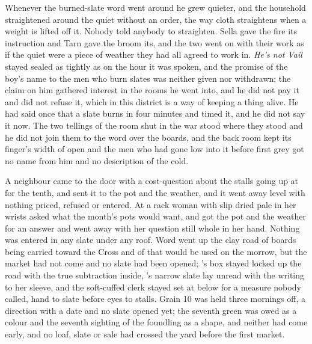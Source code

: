 Whenever the burned-slate word went around he grew quieter, and the household straightened around the quiet without an order, the way cloth straightens when a weight is lifted off it. Nobody told anybody to straighten. Sella gave the fire its instruction and Tarn gave the broom its, and the two went on with their work as if the quiet were a piece of weather they had all agreed to work in. \emph{He's not Vail} stayed sealed as tightly as on the hour it was spoken, and the promise of the boy's name to the men who burn slates was neither given nor withdrawn; the claim on him gathered interest in the rooms he went into, and he did not pay it and did not refuse it, which in this district is a way of keeping a thing alive. He had said once that a slate burns in four minutes and timed it, and he did not say it now. The two tellings of the room shut in the war stood where they stood and he did not join them to the word over the boards, and the back room kept its finger's width of open and the men who had gone low into it before first grey got no name from him and no description of the cold.

A neighbour came to the door with a cost-question about the stalls going up at  for the tenth, and  sent it to the pot and the weather, and it went away level with nothing priced, refused or entered. At  a rack woman with slip dried pale in her wrists asked what the month's pots would want, and got the pot and the weather for an answer and went away with her question still whole in her hand. Nothing was entered in any slate under any roof. Word went up the clay road of boards being carried toward the Cross and of  that would be used on the morrow, but the market had not come and no slate had been opened; 's box stayed locked up the road with the true subtraction inside, 's narrow slate lay unread with the writing to her sleeve, and the soft-cuffed clerk stayed set at  below  for a measure nobody called, hand to slate before eyes to stalls. Grain 10 was held three mornings off, a direction with a date and no slate opened yet; the seventh green was owed as a colour and the seventh sighting of the foundling as a shape, and neither had come early, and no loaf, slate or sale had crossed the yard before the first market.

\scenebreak

